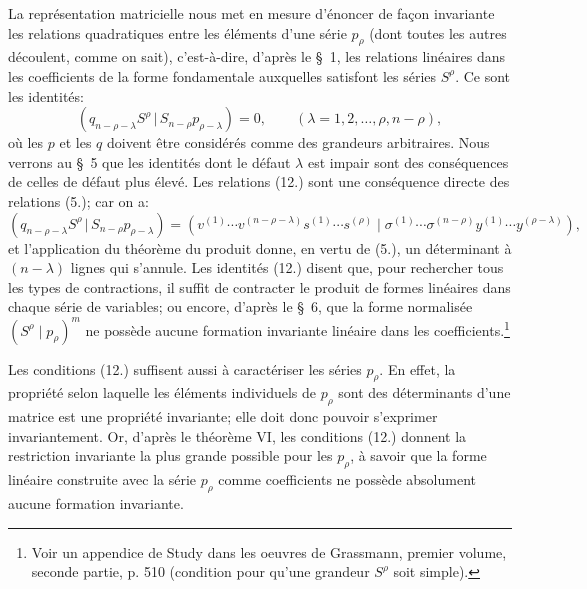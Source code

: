\documentclass[11pt]{article}
\newcommand{\pair}[2]{(#1\,|\,#2)}
\begin{document}
La représentation matricielle nous met en mesure d'énoncer de façon invariante les relations quadratiques entre les éléments d'une série $p_\rho$ (dont toutes les autres découlent, comme on sait), c'est-à-dire, d'après le \S\ 1, les relations linéaires dans les coefficients de la forme fondamentale auxquelles satisfont les séries $S^\rho$. Ce sont les identités:
\begin{equation}
 \pair{q_{n-\rho-\lambda}S^\rho}{S_{n-\rho}p_{\rho-\lambda}}=0,
 \qquad (\lambda=1,2,\ldots,\rho,n-\rho),
\tag{12}
\end{equation}
où les $p$ et les $q$ doivent être considérés comme des grandeurs arbitraires. Nous verrons au \S\ 5 que les identités dont le défaut $\lambda$ est impair sont des conséquences de celles de défaut plus élevé. Les relations (12.) sont une conséquence directe des relations (5.); car on a:
\[
 \pair{q_{n-\rho-\lambda}S^\rho}{S_{n-\rho}p_{\rho-\lambda}}
 =(v^{(1)}\cdots v^{(n-\rho-\lambda)}s^{(1)}\cdots s^{(\rho)}\mid \sigma^{(1)}\cdots\sigma^{(n-\rho)}y^{(1)}\cdots y^{(\rho-\lambda)}),
\]
et l'application du théorème du produit donne, en vertu de (5.), un déterminant à $(n-\lambda)$ lignes qui s'annule. Les identités (12.) disent que, pour rechercher tous les types de contractions, il suffit de contracter le produit de formes linéaires dans chaque série de variables; ou encore, d'après le \S\ 6, que la forme normalisée $(S^\rho\mid p_\rho)^m$ ne possède aucune formation invariante linéaire dans les coefficients.\footnote{Voir un appendice de Study dans les oeuvres de Grassmann, premier volume, seconde partie, p. 510 (condition pour qu'une grandeur $S^\rho$ soit simple).}

Les conditions (12.) suffisent aussi à caractériser les séries $p_\rho$. En effet, la propriété selon laquelle les éléments individuels de $p_\rho$ sont des déterminants d'une matrice est une propriété invariante; elle doit donc pouvoir s'exprimer invariantement. Or, d'après le théorème VI, les conditions (12.) donnent la restriction invariante la plus grande possible pour les $p_\rho$, à savoir que la forme linéaire construite avec la série $p_\rho$ comme coefficients ne possède absolument aucune formation invariante.

\clearpage
\end{document}

